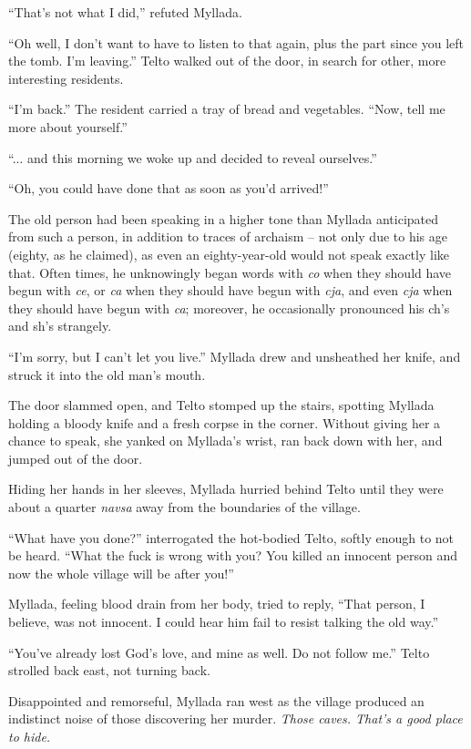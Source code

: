 ``That's not what I did,'' refuted Myllada.

``Oh well, I don't want to have to listen to that again, plus the part since you left the tomb. I'm leaving.'' Telto walked out of the door, in search for other, more interesting residents.

``I'm back.'' The resident carried a tray of bread and vegetables. ``Now, tell me more about yourself.''

\centeredstars

``... and this morning we woke up and decided to reveal ourselves.''

``Oh, you could have done that as soon as you'd arrived!''

The old person had been speaking in a higher tone than Myllada anticipated from such a person, in addition to traces of archaism -- not only due to his age (eighty, as he claimed), as even an eighty-year-old would not speak exactly like that. Often times, he unknowingly began words with \emph{co} when they should have begun with \emph{ce}, or \emph{ca} when they should have begun with \emph{cja}, and even \emph{cja} when they should have begun with \emph{ca}; moreover, he occasionally pronounced his ch's and sh's strangely.

``I'm sorry, but I can't let you live.'' Myllada drew and unsheathed her knife, and struck it into the old man's mouth.

The door slammed open, and Telto stomped up the stairs, spotting Myllada holding a bloody knife and a fresh corpse in the corner. Without giving her a chance to speak, she yanked on Myllada's wrist, ran back down with her, and jumped out of the door.

Hiding her hands in her sleeves, Myllada hurried behind Telto until they were about a quarter \emph{navsa} away from the boundaries of the village.

``What have you done?'' interrogated the hot-bodied Telto, softly enough to not be heard. ``What the fuck is wrong with you? You killed an innocent person and now the whole village will be after you!''

Myllada, feeling blood drain from her body, tried to reply, ``That person, I believe, was not innocent. I could hear him fail to resist talking the old way.''

``You've already lost God's love, and mine as well. Do not follow me.'' Telto strolled back east, not turning back.

Disappointed and remorseful, Myllada ran west as the village produced an indistinct noise of those discovering her murder. \emph{Those caves. That's a good place to hide.}

